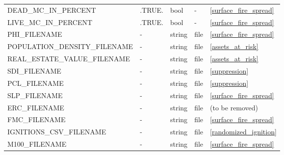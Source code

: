 \begin{landscape}
\begin{center}
\begin{longtable}{lllll}
DEAD\_MC\_IN\_PERCENT                        & .TRUE.                     & bool                   & -                                  & \ref{surface_fire_spread}            \\
LIVE\_MC\_IN\_PERCENT                        & .TRUE.                     & bool                   & -                                  & \ref{surface_fire_spread}            \\
PHI\_FILENAME                                & -                          & string                 & file                               & \ref{surface_fire_spread}            \\
POPULATION\_DENSITY\_FILENAME                & -                          & string                 & file                               & \ref{assets_at_risk}                 \\
REAL\_ESTATE\_VALUE\_FILENAME                & -                          & string                 & file                               & \ref{assets_at_risk}                 \\
SDI\_FILENAME                                & -                          & string                 & file                               & \ref{suppression}                    \\
PCL\_FILENAME                                & -                          & string                 & file                               & \ref{suppression}                    \\
SLP\_FILENAME                                & -                          & string                 & file                               & \ref{surface_fire_spread}            \\
ERC\_FILENAME                                & -                          & string                 & file                               & (to be removed)                      \\
FMC\_FILENAME                                & -                          & string                 & file                               & \ref{surface_fire_spread}            \\
IGNITIONS\_CSV\_FILENAME                     & -                          & string                 & file                               & \ref{randomized_ignition}            \\
M100\_FILENAME                               & -                          & string                 & file                               & \ref{surface_fire_spread}            \\

\end{longtable}
\end{center}
\end{landscape}
